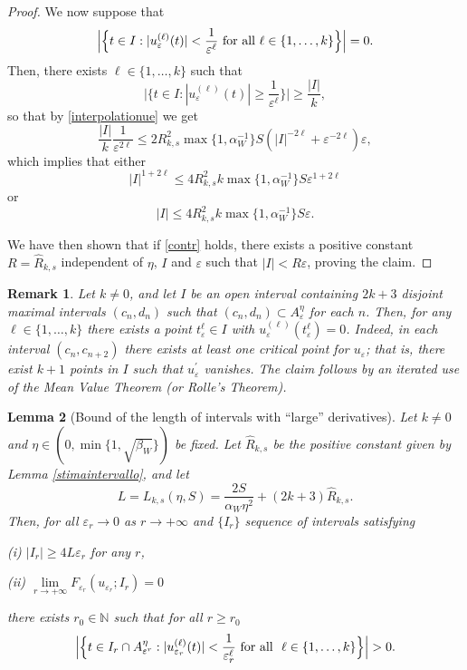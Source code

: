 \documentclass{article}
\newtheorem{lemma}{Lemma}%
\newtheorem{remark}[lemma]{Remark}
\newcommand{\e}{\varepsilon}
\begin{document}
\begin{proof}
We now suppose that 
\begin{equation}\label{contr}
\Big|\Big\{t\in I: |u_\e^{(\ell)}(t)|<\frac{1}{\e^{\ell}} \ \hbox{\rm for all } \ell\in\{1,\dots, k\}\Big\}\Big|=0.  
\end{equation} 
Then, there exists $\ell\in \{1,\dots, k\}$ such that 
$$\Big|\Big\{t\in I: |u_\e^{(\ell)}(t)|\geq\frac{1}{\e^{\ell}}\Big\} \Big|\geq \frac{|I|}{k},$$ 
so that by \eqref{interpolationue} we get 
 \begin{equation*}%
\frac{|I|}{k} \frac{1}{\e^{2\ell}}\leq 2R^2_{k,s} \max\{1,\alpha_W^{-1}\} S (|I|^{-2\ell}+
\e^{-2\ell})  \e,  
\end{equation*}
which implies that either 
\begin{equation}\label{est1}
|I|^{1+2\ell} \leq 4R^2_{k,s} k \max\{1,\alpha_W^{-1}\} S\e^{1+2\ell}
\end{equation}  
or 
\begin{equation}\label{est2}
|I|\leq 4R^2_{k,s} k 
\max\{1,\alpha_W^{-1}\} S\e.
\end{equation}

We have then shown that if \eqref{contr} holds, there exists a positive constant $R=\widehat R_{k,s}$ independent of $\eta$, $I$ and $\e$ such that $|I|<R\e$, proving the claim.  
\end{proof} 

\begin{remark}\label{dernulla}\rm Let $k\neq 0$, and 
let $I$ be an open interval containing $2k+3$ disjoint maximal intervals $(c_n,d_n)$ such that $(c_n,d_n)\subset A_\e^\eta$ for each $n$. Then, for any $\ell\in\{1,\dots, k\}$ there exists a point $t_\e^\ell\in I$ with $u_\e^{(\ell)}(t_\e^\ell)=0$. 
Indeed, in each interval $(c_n,c_{n+2})$ there exists at least one critical point for $u_\e$; that is, there exist $k+1$ points in $I$ such that $u_\e^\prime$ vanishes. The claim follows by an iterated use of the Mean Value Theorem (or Rolle's Theorem). 
\end{remark} 


\begin{lemma}[Bound of the length of intervals with ``large'' derivatives]\label{datibordo} 
Let $k\neq 0$ and $\eta\in(0,\min\{1,\sqrt{\beta_W}\})$ 
be fixed. Let $\widehat R_{k,s}$ be the positive constant given by Lemma {\rm\ref{stimaintervallo}}, and let 
\begin{equation}\label{defL}
L=L_{k,s}(\eta, S)=\frac{2S}{\alpha_W\eta^2}+(2k+3)\widehat R_{k,s}.
\end{equation} 
Then, for all $\e_r\to 0$ as $r\to+\infty$ and $\{I_r\}$ sequence of intervals satisfying 

\smallskip 

{\rm(i)} $|I_r|\geq 4L\e_r$ for any $r$, 


{\rm(ii)} $\lim\limits_{r\to+\infty}F_{\e_r}(u_{\e_r};I_r)=0$

\smallskip 

\noindent there exists $r_0\in \mathbb N$ such that for all $r\geq r_0$ 
$$\Big|\Big\{t\in I_r\cap A_{\e^r}^\eta: |u^{(\ell)}_{\e_r}(t)|<\frac{1}{\e_r^\ell}\ \hbox{\rm for all }\ \ell\in\{1,\dots, k\}\Big\}\Big|>0.$$
\end{lemma}
\end{document}
